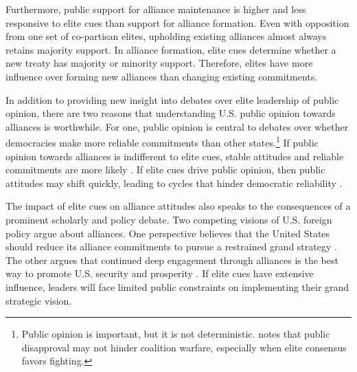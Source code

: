\documentclass[12pt]{article}
\begin{document}
Furthermore, public support for alliance maintenance is higher and less responsive to elite cues than support for alliance formation.
Even with opposition from one set of co-partisan elites, upholding existing alliances almost always retains majority support. 
In alliance formation, elite cues determine whether a new treaty has majority or minority support. 
Therefore, elites have more influence over forming new alliances than changing existing commitments. 


In addition to providing new insight into debates over elite leadership of public opinion, there are two reasons that understanding U.S. public opinion towards alliances is worthwhile. 
For one, public opinion is central to debates over whether democracies make more reliable commitments than other states.\footnote{Public opinion is important, but it is not deterministic. \citet{Kreps2010} notes that public disapproval may not hinder coalition warfare, especially when elite consensus favors fighting.} 
If public opinion towards alliances is indifferent to elite cues, stable attitudes and reliable commitments are more likely \citep{Gaubatz1996}.
If elite cues drive public opinion, then public attitudes may shift quickly, leading to cycles that hinder democratic reliability \citep{GartzkeGleditsch2004}.


The impact of elite cues on alliance attitudes also speaks to the consequences of a prominent scholarly and policy debate. 
Two competing visions of U.S. foreign policy argue about alliances. 
One perspective believes that the United States should reduce its alliance commitments to pursue a restrained grand strategy \citep{Preble2009, Posen2014}.
The other argues that continued deep engagement through alliances is the best way to promote U.S. security and prosperity \citep{Brooksetal2013, BrandsFeaver2017}. 
If elite cues have extensive influence, leaders will face limited public constraints on implementing their grand strategic vision. 
\end{document}
